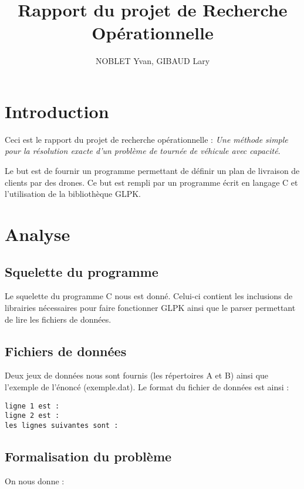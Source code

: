 \documentclass[a4paper,10pt]{report}
\title{Rapport du projet de Recherche Opérationnelle}
\author{NOBLET Yvan, GIBAUD Lary}
\begin{document}
\renewcommand{\labelitemi}{$\bullet$}


\date{}
\maketitle
\tableofcontents
\section{Introduction}

Ceci est le rapport du projet de recherche opérationnelle : 
\emph{Une méthode simple pour la résolution exacte d’un problème
 de tournée de véhicule avec capacité}.

Le but est de fournir un programme permettant de définir un plan de livraison de clients par des drones. 
Ce but est rempli par un programme écrit en langage C et l'utilisation de la bibliothèque GLPK.

\section{Analyse}

\subsection{Squelette du programme}

Le squelette du programme C nous est donné. Celui-ci contient les inclusions de librairies nécessaires pour faire fonctionner GLPK ainsi que le parser permettant de lire les fichiers de données.

\subsection{Fichiers de données}

Deux jeux de données nous sont fournis (les répertoires A et B) ainsi que l'exemple de l'énoncé (exemple.dat). Le format du fichier de données est ainsi :
\begin{verbatim}
ligne 1 est :
ligne 2 est :
les lignes suivantes sont :
\end{verbatim}

\subsection{Formalisation du problème}

On nous donne :
\end{document}
